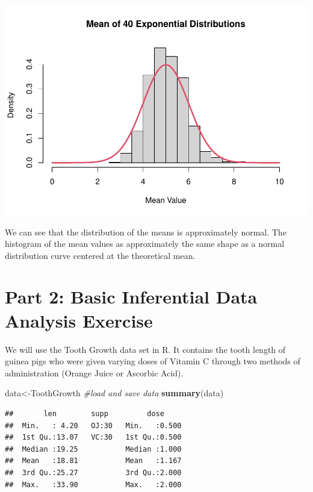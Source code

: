 \documentclass[
]{article}
\newenvironment{Shaded}{\begin{snugshade}}{\end{snugshade}}
\newcommand{\CommentTok}[1]{\textcolor[rgb]{0.56,0.35,0.01}{\textit{#1}}}
\newcommand{\KeywordTok}[1]{\textcolor[rgb]{0.13,0.29,0.53}{\textbf{#1}}}
\newcommand{\NormalTok}[1]{#1}
\begin{document}
\includegraphics{Statistical-Inference-Project_files/figure-latex/unnamed-chunk-6-1.pdf}

We can see that the distribution of the means is approximately normal.
The histogram of the mean values as approximately the same shape as a
normal distribution curve centered at the theoretical mean.

\hypertarget{part-2-basic-inferential-data-analysis-exercise}{%
\section{Part 2: Basic Inferential Data Analysis
Exercise}\label{part-2-basic-inferential-data-analysis-exercise}}

We will use the Tooth Growth data set in R. It contains the tooth length
of guinea pigs who were given varying doses of Vitamin C through two
methods of administration (Orange Juice or Ascorbic Acid).

\begin{Shaded}
\begin{Highlighting}[]
\NormalTok{data\textless{}{-}ToothGrowth }\CommentTok{\#load and save data}
\KeywordTok{summary}\NormalTok{(data)}
\end{Highlighting}
\end{Shaded}

\begin{verbatim}
##       len        supp         dose      
##  Min.   : 4.20   OJ:30   Min.   :0.500  
##  1st Qu.:13.07   VC:30   1st Qu.:0.500  
##  Median :19.25           Median :1.000  
##  Mean   :18.81           Mean   :1.167  
##  3rd Qu.:25.27           3rd Qu.:2.000  
##  Max.   :33.90           Max.   :2.000
\end{verbatim}
\end{document}
